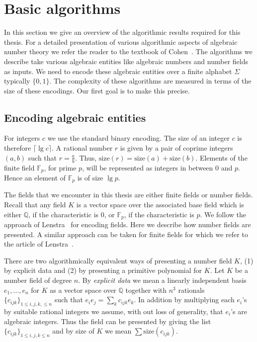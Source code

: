 \documentclass[11pt]{madras}%
\theoremstyle{remark}
\newcommand{\size}[1]{{\ensuremath{\mathrm{size}\left(#1\right)}}}
\begin{document}
\section{Basic algorithms}\label{sect-basicalgo-ant}

In this section we give an overview of the algorithmic results
required for this thesis. For a detailed presentation of various
algorithmic aspects of algebraic number theory we refer the reader to
the textbook of Cohen~\cite{cohen:1993}. The algorithms we describe
take various algebraic entities like algebraic numbers and number
fields as inputs.  We need to encode these algebraic entities over a
finite alphabet $\Sigma$ typically $\{0,1\}$. The complexity of these
algorithms are measured in terms of the size of these encodings. Our
first goal is to make this precise.


\subsection{Encoding algebraic entities}

For integers $c$ we use the standard binary encoding.  The size of an
integer $c$ is therefore $\lceil \lg{c}\rceil$. A rational number $r$
is given by a pair of coprime integers $(a,b)$ such that $r =
\frac{a}{b}$. Thus, $\size{r} = \size{a} + \size{b}$. Elements of the
finite field $\mathbb{F}_p$, for prime $p$, will be represented as
integers in between $0$ and $p$. Hence an element of $\mathbb{F}_p$ is
of size $\lg{p}$.

The fields that we encounter in this thesis are either finite fields
or number fields. Recall that any field $K$ is a vector space over the
associated base field which is either $\mathbb{Q}$, if the
characteristic is $0$, or $\mathbb{F}_p$, if the characteristic is
$p$.  We follow the approach of
Lenstra~\cite{lenstra91isomorphisms,lenstra92algorithm} for encoding
fields. Here we describe how number fields are presented. A similar
approach can be taken for finite fields for which we refer to the
article of Lenstra~\cite{lenstra91isomorphisms}.

There are two algorithmically equivalent ways of presenting a number
field $K$, (1) by explicit data and (2) by presenting a primitive
polynomial for $K$.  Let $K$ be a number field of degree $n$. By
\emph{explicit data} we mean a linearly independent basis
$e_1,\ldots,e_n$ for $K$ as a vector space over $\mathbb{Q}$ together
with $n^3$ rationals $\{c_{ijk}\}_{1 \leq i, j, k, \leq n}$ such that
$e_i e_j = \sum_k c_{ijk} e_k$.  In addition by multiplying each
$e_i$'s by suitable rational integers we assume, with out loss of
generality, that $e_i$'s are algebraic integers.  Thus the field can
be presented by giving the list $\{c_{ijk}\}_{1 \leq i,j,k \leq n}$
and by size of $K$ we mean $\sum \size{c_{ijk}}$.
\end{document}
